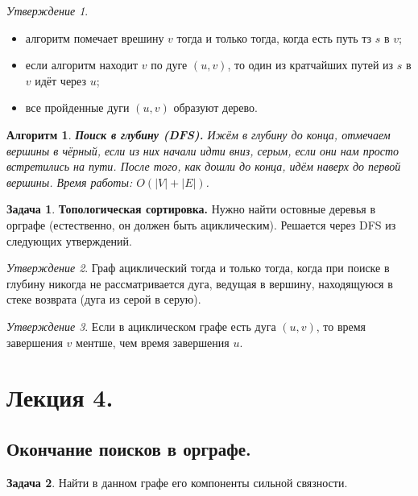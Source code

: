 \documentclass[a4paper]{article}
\theoremstyle{indented}
\newtheorem{alg}{Алгоритм}
\theoremstyle{definition}
\newtheorem{prob}{Задача}
\theoremstyle{remark}
\newtheorem{stat}{Утверждение}
\begin{document}
\begin{stat} \ 
    \begin{itemize}
        \item алгоритм помечает врешину $v$ тогда и только тогда, когда есть путь тз $s$ в $v$; 
        \item если алгоритм находит $v$ по дуге $(u, v)$, то один из кратчайших путей из $s$ в $v$ идёт через $u$; 
        \item все пройденные дуги $(u, v)$ образуют дерево.
    \end{itemize}
\end{stat}

\begin{alg}
    \textbf{Поиск в глубину (DFS).} Ижём в глубину до конца, отмечаем вершины в чёрный, если из них начали идти вниз, серым, если они нам просто встретились на пути. После того, как дошли до конца, идём наверх до первой вершины. Время работы: $O(|V|+|E|)$. 
\end{alg}

\begin{prob}
    \textbf{Топологическая сортировка.} Нужно найти остовные деревья в орграфе (естественно, он должен быть ациклическим). Решается через DFS из следующих утверждений. 
\end{prob}

\begin{stat}
    Граф ациклический тогда и только тогда, когда при поиске в глубину никогда не рассматривается дуга, ведущая в вершину, находящуюся в стеке возврата (дуга из серой в серую).
\end{stat}

\begin{stat}
    Если в ациклическом графе есть дуга $(u, v)$, то время завершения $v$ ментше, чем время завершения $u$. 
\end{stat}

\section{Лекция 4.}

\subsection{Окончание поисков в орграфе.}

\begin{prob}
    Найти в данном графе его компоненты сильной связности. 
\end{prob}
\end{document}
